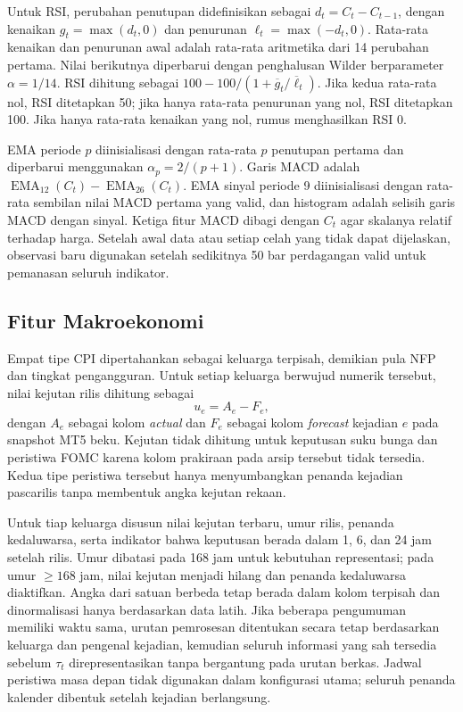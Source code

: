 Untuk RSI, perubahan penutupan didefinisikan sebagai $d_t=C_t-C_{t-1}$, dengan kenaikan $g_t=\max(d_t,0)$ dan penurunan $\ell_t=\max(-d_t,0)$. Rata-rata kenaikan dan penurunan awal adalah rata-rata aritmetika dari 14 perubahan pertama. Nilai berikutnya diperbarui dengan penghalusan Wilder berparameter $\alpha=1/14$. RSI dihitung sebagai $100-100/(1+\overline g_t/\overline\ell_t)$. Jika kedua rata-rata nol, RSI ditetapkan 50; jika hanya rata-rata penurunan yang nol, RSI ditetapkan 100. Jika hanya rata-rata kenaikan yang nol, rumus menghasilkan RSI 0.

EMA periode $p$ diinisialisasi dengan rata-rata $p$ penutupan pertama dan diperbarui menggunakan $\alpha_p=2/(p+1)$. Garis MACD adalah $\operatorname{EMA}_{12}(C_t)-\operatorname{EMA}_{26}(C_t)$. EMA sinyal periode 9 diinisialisasi dengan rata-rata sembilan nilai MACD pertama yang valid, dan histogram adalah selisih garis MACD dengan sinyal. Ketiga fitur MACD dibagi dengan $C_t$ agar skalanya relatif terhadap harga. Setelah awal data atau setiap celah yang tidak dapat dijelaskan, observasi baru digunakan setelah sedikitnya 50 bar perdagangan valid untuk pemanasan seluruh indikator.

\subsection{Fitur Makroekonomi}

Empat tipe CPI dipertahankan sebagai keluarga terpisah, demikian pula NFP dan tingkat pengangguran. Untuk setiap keluarga berwujud numerik tersebut, nilai kejutan rilis dihitung sebagai
\begin{equation}
u_{e}=A_{e}-F_{e},
\label{eq:kejutan-makro}
\end{equation}
dengan $A_e$ sebagai kolom \emph{actual} dan $F_e$ sebagai kolom \emph{forecast} kejadian $e$ pada snapshot MT5 beku. Kejutan tidak dihitung untuk keputusan suku bunga dan peristiwa FOMC karena kolom prakiraan pada arsip tersebut tidak tersedia. Kedua tipe peristiwa tersebut hanya menyumbangkan penanda kejadian pascarilis tanpa membentuk angka kejutan rekaan.

Untuk tiap keluarga disusun nilai kejutan terbaru, umur rilis, penanda kedaluwarsa, serta indikator bahwa keputusan berada dalam 1, 6, dan 24 jam setelah rilis. Umur dibatasi pada 168 jam untuk kebutuhan representasi; pada umur $\geq168$ jam, nilai kejutan menjadi hilang dan penanda kedaluwarsa diaktifkan. Angka dari satuan berbeda tetap berada dalam kolom terpisah dan dinormalisasi hanya berdasarkan data latih. Jika beberapa pengumuman memiliki waktu sama, urutan pemrosesan ditentukan secara tetap berdasarkan keluarga dan pengenal kejadian, kemudian seluruh informasi yang sah tersedia sebelum $\tau_t$ direpresentasikan tanpa bergantung pada urutan berkas. Jadwal peristiwa masa depan tidak digunakan dalam konfigurasi utama; seluruh penanda kalender dibentuk setelah kejadian berlangsung.

